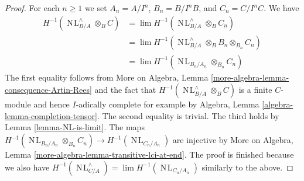 \documentclass[10pt,a4paper]{amsart}
\theoremstyle{plain}
\theoremstyle{definition}
\theoremstyle{remark}
\numberwithin{equation}{subsection}
\def\lim{\mathop{\mathrm{lim}}\nolimits}
\def\NL{\mathop{N\!L}\nolimits}
\begin{document}
\begin{proof}
For each $n \geq 1$ we set $A_n = A/I^n$, $B_n = B/I^nB$, and
$C_n = C/I^nC$. We have
\begin{align*}
H^{-1}(\NL_{B/A}^\wedge \otimes_B C)
& =
\lim H^{-1}(\NL_{B/A}^\wedge \otimes_B C_n) \\
& =
\lim H^{-1}(\NL_{B/A}^\wedge \otimes_B B_n \otimes_{B_n} C_n) \\
& =
\lim H^{-1}(\NL_{B_n/A_n} \otimes_{B_n} C_n)
\end{align*}
The first equality follows from
More on Algebra, Lemma \ref{more-algebra-lemma-consequence-Artin-Rees}
and the fact that $H^{-1}(\NL_{B/A}^\wedge \otimes_B C)$ is a finite
$C$-module and hence $I$-adically complete for example by
Algebra, Lemma \ref{algebra-lemma-completion-tensor}.
The second equality is trivial.
The third holds by Lemma \ref{lemma-NL-is-limit}.
The maps $H^{-1}(\NL_{B_n/A_n} \otimes_{B_n} C_n) \to
H^{-1}(\NL_{C_n/A_n})$ are injective by
More on Algebra, Lemma \ref{more-algebra-lemma-transitive-lci-at-end}.
The proof is finished because we also have
$H^{-1}(\NL_{C/A}^\wedge) = \lim H^{-1}(\NL_{C_n/A_n})$
similarly to the above.
\end{proof}
\end{document}
